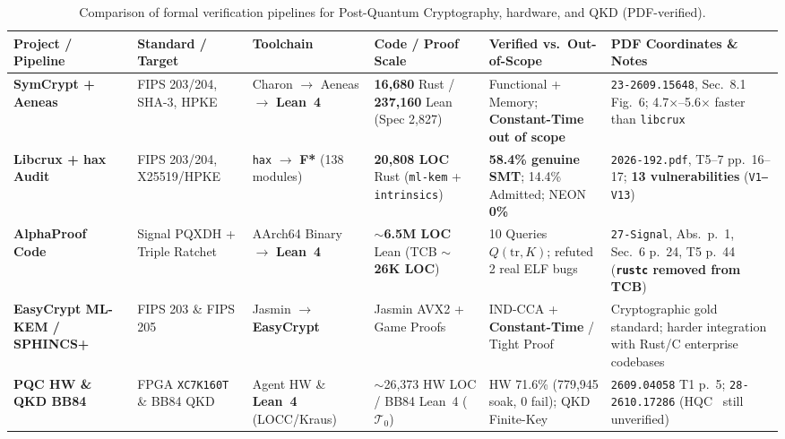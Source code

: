 \documentclass[10pt,twocolumn]{article}
\begin{document}
\begin{table}[tp]
  \centering
  \scriptsize
  \caption{Comparison of formal verification pipelines for Post-Quantum Cryptography, hardware, and QKD (PDF-verified).}
  \label{tab:rq2a}
  \begin{tabularx}{\textwidth}{L{2.3cm} L{2.2cm} L{2.2cm} L{2.5cm} L{3.1cm} Y}
    \toprule
    \textbf{Project / Pipeline} & \textbf{Standard / Target} & \textbf{Toolchain} & \textbf{Code / Proof Scale} & \textbf{Verified vs.\ Out-of-Scope} & \textbf{PDF Coordinates \& Notes} \\
    \midrule
    \textbf{SymCrypt + Aeneas}~\cite{ho2026symcrypt} & FIPS 203/204, SHA-3, HPKE & Charon $\to$ Aeneas $\to$ \textbf{Lean~4} & \textbf{16,680} Rust / \textbf{237,160} Lean (Spec 2,827) & Functional + Memory; \textbf{Constant-Time out of scope} & \texttt{23-2609.15648}, Sec.~8.1 Fig.~6; 4.7$\times$--5.6$\times$ faster than \texttt{libcrux} \\
    \textbf{Libcrux + hax Audit}~\cite{bhargavan2025hax,kobeissi2026theatre} & FIPS 203/204, X25519/HPKE & \texttt{hax} $\to$ \textbf{F*} (138 modules) & \textbf{20,808 LOC} Rust (\texttt{ml-kem} + \texttt{intrinsics}) & \textbf{58.4\% genuine SMT}; 14.4\% Admitted; NEON \textbf{0\%} & \texttt{2026-192.pdf}, T5--7 pp.~16--17; \textbf{13 vulnerabilities} (\texttt{V1--V13}) \\
    \textbf{AlphaProof Code}~\cite{chaudhuri2026alphaproofcode} & Signal PQXDH + Triple Ratchet & AArch64 Binary $\to$ \textbf{Lean~4} & \textbf{$\sim$6.5M LOC} Lean (TCB \textbf{$\sim$26K LOC}) & 10 Queries $Q(\mathrm{tr}, K)$; refuted 2 real ELF bugs & \texttt{27-Signal}, Abs.~p.~1, Sec.~6 p.~24, T5 p.~44 (\textbf{\texttt{rustc} removed from TCB}) \\
    \textbf{EasyCrypt ML-KEM / SPHINCS+}~\cite{almeida2024kyber,barbosa2024sphincs} & FIPS 203 \& FIPS 205 & Jasmin $\to$ \textbf{EasyCrypt} & Jasmin AVX2 + Game Proofs & IND-CCA + \textbf{Constant-Time} / Tight Proof & Cryptographic gold standard; harder integration with Rust/C enterprise codebases \\
    \textbf{PQC HW \& QKD BB84}~\cite{park2026pqchw,benshahar2026qkd} & FPGA \texttt{XC7K160T} \& BB84 QKD & Agent HW \& \textbf{Lean~4} (LOCC/Kraus) & $\sim$26,373 HW LOC / BB84 Lean~4 ($\mathcal{T}_0$) & HW 71.6\% (779,945 soak, 0 fail); QKD Finite-Key & \texttt{2609.04058} T1 p.~5; \texttt{28-2610.17286} (HQC~\cite{alagic2025nistir8545} still unverified) \\
    \bottomrule
  \end{tabularx}
\end{table}
\end{document}

